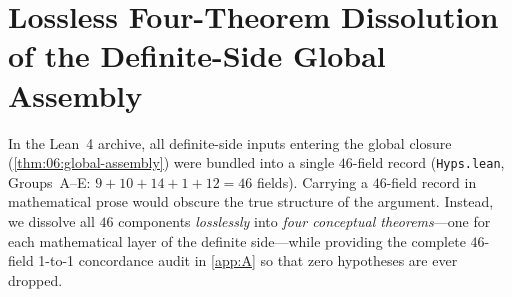 \section{Lossless Four-Theorem Dissolution of the Definite-Side Global Assembly}
\label{sec:17:definite-assembly}

In the Lean~4 archive, all definite-side inputs entering the global closure (\cref{thm:06:global-assembly}) were bundled into a single $46$-field record (\texttt{Hyps.lean}, Groups~A--E: $9 + 10 + 14 + 1 + 12 = 46$ fields). Carrying a $46$-field record in mathematical prose would obscure the true structure of the argument. Instead, we dissolve all $46$ components \emph{losslessly} into \emph{four conceptual theorems}—one for each mathematical layer of the definite side—while providing the complete $46$-field 1-to-1 concordance audit in \cref{app:A} so that zero hypotheses are ever dropped.



